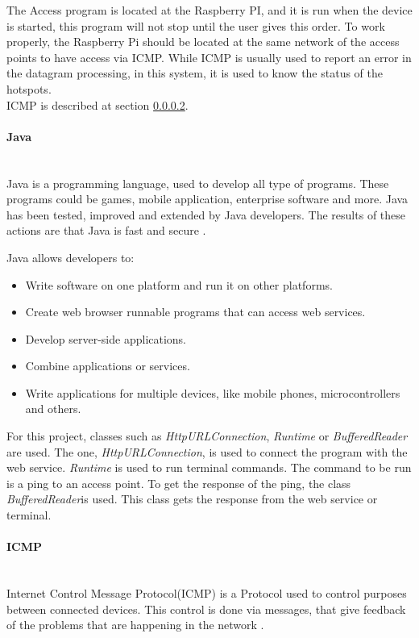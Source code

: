 \documentclass[12pt, a4paper,twoside]{tesi_upf}
\begin{document}
The Access program is located at the Raspberry PI, and it is run when the device is started, this program will not stop until the user gives this order. To work properly, the Raspberry Pi should be located at the same network of the access points to have access via ICMP. While ICMP is usually used to report an error in the datagram processing, in this system, it is used to know the status of the hotspots.\\

            ICMP is described at section \ref{icmp}.

            \paragraph{Java}
            \label{java}\\
            Java is a programming language, used to develop all type of programs. These programs could be games, mobile application, enterprise software and more. 
            Java has been tested, improved and extended by Java developers. The results of these actions are that Java is fast and secure \cite{Java}. 
            
            Java allows developers to:
            \begin{itemize}
            \item Write software on one platform and run it on other platforms.
            \item Create web browser runnable programs that can  access web services.
            \item Develop server-side applications.
            \item Combine applications or services.
            \item Write applications for multiple devices, like mobile phones, microcontrollers and others.
\end{itemize}
            
           For this project, classes such as \emph{HttpURLConnection}, \emph{Runtime} or \emph{BufferedReader} are used. The one, \emph{HttpURLConnection}, is used to connect the program with the web service. \emph{Runtime} is used to run terminal commands. The command to be run is a ping to an access point. To get the response of the ping, the class \emph{BufferedReader}is used. This class gets the response from the web service or terminal. 
             
            
            \paragraph{ICMP}
            \label{icmp}\\
            Internet Control Message Protocol(ICMP) is a Protocol used to control purposes between connected devices. This control is done via messages, that give feedback of the problems that are happening in the network \cite{icmp}.\\
            
\end{document}
